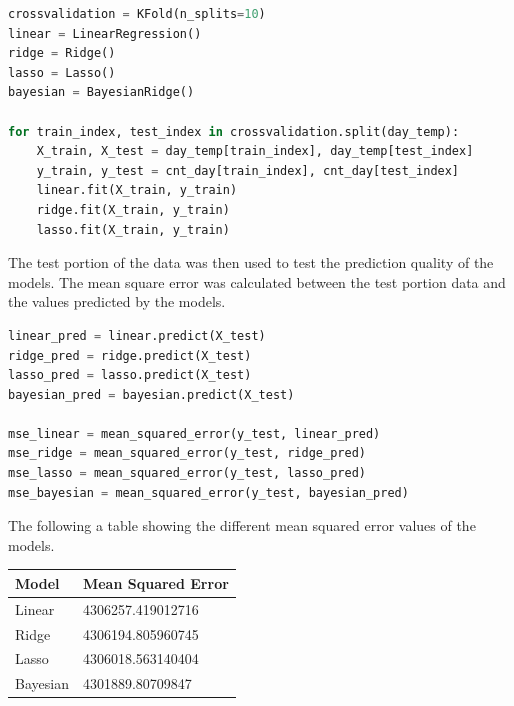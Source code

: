 \documentclass{homework}
\begin{document}
\begin{solution}
\begin{solution}
\begin{lstlisting}[language=Python, firstnumber=39]
crossvalidation = KFold(n_splits=10)
linear = LinearRegression()
ridge = Ridge()
lasso = Lasso()
bayesian = BayesianRidge()

for train_index, test_index in crossvalidation.split(day_temp):
    X_train, X_test = day_temp[train_index], day_temp[test_index]
    y_train, y_test = cnt_day[train_index], cnt_day[test_index]
    linear.fit(X_train, y_train)
    ridge.fit(X_train, y_train)
    lasso.fit(X_train, y_train)
\end{lstlisting}

The test portion of the data was then used to test the prediction quality of the models. The mean square error was calculated between the test portion data and the values predicted by the models. 

\begin{lstlisting}[language=Python, firstnumber=53]
linear_pred = linear.predict(X_test)
ridge_pred = ridge.predict(X_test)
lasso_pred = lasso.predict(X_test)
bayesian_pred = bayesian.predict(X_test)

mse_linear = mean_squared_error(y_test, linear_pred)
mse_ridge = mean_squared_error(y_test, ridge_pred)
mse_lasso = mean_squared_error(y_test, lasso_pred)
mse_bayesian = mean_squared_error(y_test, bayesian_pred)
\end{lstlisting}

The following a table showing the different mean squared error values of the models. 

\begin{table}[h]
    \centering
    \begin{tabular}{|l|l|}
    \hline
    Model  & Mean Squared Error \\ \hline
    Linear & 4306257.419012716 \\ 
    Ridge  & 4306194.805960745 \\ 
    Lasso  & 4306018.563140404 \\ 
    Bayesian & 4301889.80709847 \\
    \hline
    \end{tabular}
\end{table}


\end{solution}
\end{solution}
\end{document}
